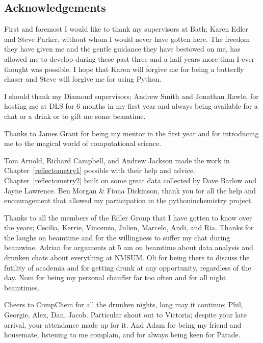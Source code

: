 \documentclass[twoside,symmetric,nobib]{./arm-thesis}
\newcommand{\blankpage}{\newpage\hbox{}\thispagestyle{empty}\newpage}
\begin{document}
\blankpage

\newpage
\begin{fullwidth}
\thispagestyle{empty}
\chapter*{Acknowledgements}

First and foremost I would like to thank my supervisors at Bath; Karen Edler and Steve Parker, without whom I would never have gotten here.
The freedom they have given me and the gentle guidance they have bestowed on me, has allowed me to develop during these past three and a half years more than I ever thought was possible.
I hope that Karen will forgive me for being a butterfly chaser and Steve will forgive me for using Python.

I should thank my Diamond supervisors; Andrew Smith and Jonathan Rawle, for hosting me at DLS for 6 months in my first year and always being available for a chat or a drink or to gift me some beamtime.

Thanks to James Grant for being my mentor in the first year and for introducing me to the magical world of computational science.

Tom Arnold, Richard Campbell, and Andrew Jackson made the work in Chapter~\ref{reflectometry1} possible with their help and advice. Chapter~\ref{reflectometry2} built on some great data collected by Dave Barlow and Jayne Lawrence. Ben Morgan \& Fiona Dickinson, thank you for all the help and encouragement that allowed my participation in the pythoninchemistry project.

Thanks to all the members of the Edler Group that I have gotten to know over the years; Cecilia, Kerrie, Vincenzo, Julien, Marcelo, Andi, and Ria. Thanks for the laughs on beamtime and for the willingness to suffer my chat during beamwine.
Adrian for arguments at 5 am on beamtime about data analysis and drunken chats about everything at NMSUM.
Oli for being there to discuss the futility of academia and for getting drunk at any opportunity, regardless of the day.
Nom for being my personal chauffer far too often and for all night beamtimes.

Cheers to CompChem for all the drunken nights, long may it continue; Phil, Georgie, Alex, Dan, Jacob.
Particular shout out to Victoria; despite your late arrival, your attendance made up for it.
And Adam for being my friend and housemate, listening to me complain, and for always being keen for Parade.


\end{fullwidth}
\end{document}
